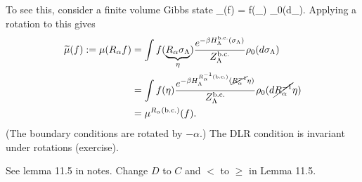\documentclass[12pt]{book}
\theoremstyle{norm}
\begin{document}
To see this, consider a finite volume Gibbs state
\be
\mu_{\Lambda}(f) = \int f(\sigma_\Lambda)  \rho_0(d\sigma_\Lambda).
\ee
Applying a rotation to this gives
\begin{align}
\widetilde{\mu}(f) := \mu(R_\alpha f)&= \int f(\underbrace{R_\alpha\sigma_\Lambda}_{\eta}) \frac{e^{-\beta H^{\text{b.c.}}_\Lambda(\sigma_\Lambda)} }{Z_{\Lambda}^{\text{b.c.}}} \rho_0(d\sigma_\Lambda)\\
&=\int f(\eta) \frac{e^{-\beta H^{R_\alpha^{-1}(\text{b.c.})}_\Lambda (\cancel{R_{\alpha}^{-1}}\eta)} }{Z_{\Lambda}^{\text{b.c.}}} \rho_0(d\cancel{R_{\alpha}^{-1}}\eta)\\
&= \mu^{R_{\alpha}\left( \text{b.c.} \right)}(f).
\end{align}
(The boundary conditions are rotated by $-\alpha$.)
The DLR condition is invariant under rotations (exercise).

{\color{red}See lemma 11.5 in notes. Change $D$ to $C$ and $<$ to $\ge$ in Lemma 11.5.}


\end{document}
